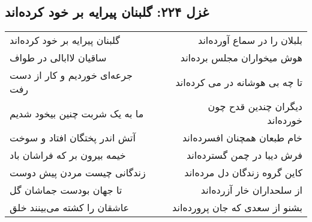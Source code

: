 \begin{center}
\section*{غزل ۲۲۴: گلبنان پیرایه بر خود کرده‌اند}
\label{sec:224}
\begin{longtable}{l p{0.5cm} r}
گلبنان پیرایه بر خود کرده‌اند
&&
بلبلان را در سماع آورده‌اند
\\
ساقیان لاابالی در طواف
&&
هوش میخواران مجلس برده‌اند
\\
جرعه‌ای خوردیم و کار از دست رفت
&&
تا چه بی هوشانه در می کرده‌اند
\\
ما به یک شربت چنین بیخود شدیم
&&
دیگران چندین قدح چون خورده‌اند
\\
آتش اندر پختگان افتاد و سوخت
&&
خام طبعان همچنان افسرده‌اند
\\
خیمه بیرون بر که فراشان باد
&&
فرش دیبا در چمن گسترده‌اند
\\
زندگانی چیست مردن پیش دوست
&&
کاین گروه زندگان دل مرده‌اند
\\
تا جهان بودست جماشان گل
&&
از سلحداران خار آزرده‌اند
\\
عاشقان را کشته می‌بینند خلق
&&
بشنو از سعدی که جان پرورده‌اند
\\
\end{longtable}
\end{center}
